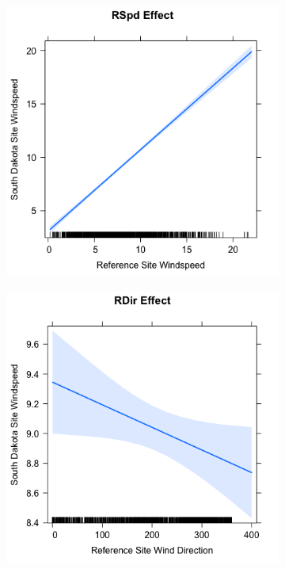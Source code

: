\documentclass[12pt]{article}
\makeatletter
\theoremstyle{homework}
\newenvironment{exercise}[1]
{\def\@currentlabel{#1}\exercisecore}
{\endexercisecore}
\makeatother
\begin{document}
\begin{exercise}{1}
\begin{exercise}{2}
\begin{enumerate}
    \begin{figure}[H]
      \centering
      \begin{subfigure}[b]{0.45\textwidth}
          \centering
          \includegraphics[width=\textwidth]{Rplot01.png}
      \end{subfigure}
      \hfill
      \begin{subfigure}[b]{0.45\textwidth}
          \centering
          \includegraphics[width=\textwidth]{Rplot1.png}

\end{subfigure}
\end{figure}
\end{enumerate}
\end{exercise}
\end{exercise}
\end{document}
